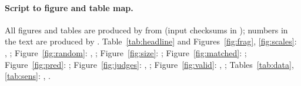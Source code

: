 \documentclass{article}
\begin{document}
\paragraph{Script to figure and table map.} All figures and tables are produced by  from  (input checksums in ); numbers in the text are produced by . Table~\ref{tab:headline} and Figures~\ref{fig:frag}, \ref{fig:scales}: , ; Figure~\ref{fig:random}: , ; Figure~\ref{fig:size}: ; Figure~\ref{fig:matched}: ; Figure~\ref{fig:pred}: ; Figure~\ref{fig:judges}: , ; Figure~\ref{fig:valid}: , ; Tables~\ref{tab:data}, \ref{tab:sens}: , .
\end{document}
